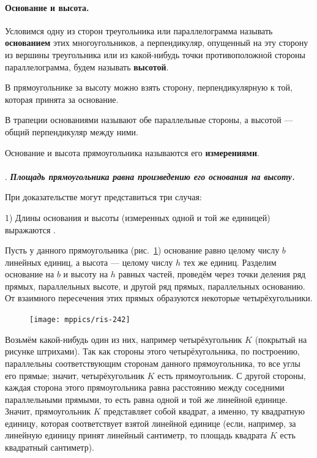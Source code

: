 \documentclass[oneside]{book}
\makeatletter
\newcommand{\rindex}[2][\imki@jobname]{%
  \index[#1]{\detokenize{#2}}%
}
\makeatother
\begin{document}
\paragraph{Основание и высота.}\label{1938/245}
Условимся одну из сторон треугольника или параллелограмма называть \rindex{основание}\textbf{основанием} этих многоугольников, а перпендикуляр, опущенный на эту сторону из вершины треугольника или из какой-нибудь точки противоположной стороны параллелограмма, будем называть \rindex{высота}\textbf{высотой}.

В прямоугольнике за высоту можно взять сторону, перпендикулярную к той, которая принята за основание.

В трапеции основаниями называют обе параллельные стороны, а высотой — общий перпендикуляр между ними.

Основание и высота прямоугольника называются его \rindex{измерения прямоугольника}\textbf{измерениями}.

\paragraph{}\label{1938/246}
.
\textbf{\emph{Площадь прямоугольника равна произведению его основания на высоту.}}

При доказательстве могут представиться три случая:


1) Длины основания и высоты (измеренных одной и той же единицей) выражаются .

Пусть у данного прямоугольника (рис.~\ref{1938/ris-242}) основание равно целому числу $b$ линейных единиц, а высота — целому числу $h$ тех же единиц.
Разделим основание на $b$ и высоту на $h$ равных частей, проведём через точки деления ряд прямых, параллельных высоте, и другой ряд прямых, параллельных основанию.
От взаимного пересечения этих прямых образуются некоторые четырёхугольники.

\begin{figure}
\centering
\texttt{[image: mppics/ris-242]}
\caption{}\label{1938/ris-242}
\end{figure}

Возьмём какой-нибудь один из них, например четырёхугольник $K$ (покрытый на рисунке штрихами).
Так как стороны этого четырёхугольника, по построению, параллельны соответствующим сторонам данного прямоугольника, то все углы его прямые;
значит, четырёхугольник $K$ есть прямоугольник.
С другой стороны, каждая сторона этого прямоугольника равна расстоянию между соседними параллельными прямыми, то есть равна одной и той же линейной единице. 
Значит, прямоугольник $K$ представляет собой квадрат, а именно, ту квадратную единицу, которая соответствует взятой линейной единице (если, например, за линейную единицу принят линейный сантиметр, то площадь квадрата $K$ есть квадратный сантиметр).
\end{document}
